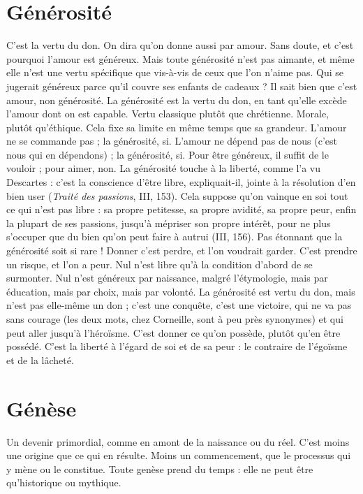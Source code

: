 \section{Générosité}
C’est la vertu du don. On dira qu’on donne aussi par
amour. Sans doute, et c’est pourquoi l’amour est généreux.
Mais toute générosité n’est pas aimante, et même elle n’est une vertu spécifique
que vis-à-vis de ceux que l’on n'aime pas. Qui se jugerait généreux parce qu’il
couvre ses enfants de cadeaux ? Il sait bien que c’est amour, non générosité. La
générosité est la vertu du don, en tant qu’elle excède l'amour dont on est
capable. Vertu classique plutôt que chrétienne. Morale, plutôt qu’éthique. Cela
fixe sa limite en même temps que sa grandeur. L'amour ne se commande pas ;
la générosité, si. L'amour ne dépend pas de nous (c’est nous qui en
dépendons) ; la générosité, si. Pour être généreux, il suffit de le vouloir ; pour
aimer, non. La générosité touche à la liberté, comme l’a vu Descartes : c’est la
conscience d’être libre, expliquait-il, jointe à la résolution d’en bien user ({\it Traité
des passions}, III, 153). Cela suppose qu’on vainque en soi tout ce qui n’est pas
libre : sa propre petitesse, sa propre avidité, sa propre peur, enfin la plupart de
ses passions, jusqu’à mépriser son propre intérêt, pour ne plus s’occuper que du
bien qu’on peut faire à autrui (III, 156). Pas étonnant que la générosité soit si
rare ! Donner c’est perdre, et l’on voudrait garder. C’est prendre un risque, et
l’on a peur. Nul n’est libre qu’à la condition d’abord de se surmonter. Nul n’est
généreux par naissance, malgré l’étymologie, mais par éducation, mais par
choix, mais par volonté. La générosité est vertu du don, mais n’est pas elle-même
un don ; c’est une conquête, c’est une victoire, qui ne va pas sans courage
(les deux mots, chez Corneille, sont à peu près synonymes) et qui peut
aller jusqu’à l’héroïsme. C’est donner ce qu’on possède, plutôt qu’en être possédé.
C’est la liberté à l'égard de soi et de sa peur : le contraire de l’égoïsme et
de la lâcheté.

\section{Génèse}
Un devenir primordial, comme en amont de la naissance ou du
réel. C’est moins une origine que ce qui en résulte. Moins un commencement,
que le processus qui y mène ou le constitue. Toute genèse prend
du temps : elle ne peut être qu’historique ou mythique.

